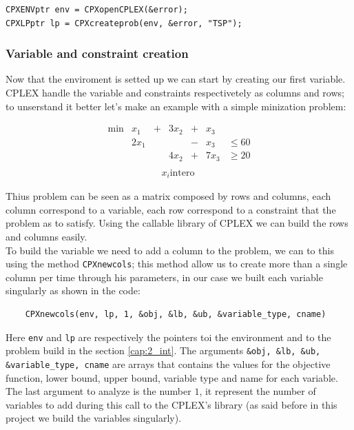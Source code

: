 \begin{lstlisting}
CPXENVptr env = CPXopenCPLEX(&error);
CPXLPptr lp = CPXcreateprob(env, &error, "TSP");
\end{lstlisting}

\subsubsection{Variable and constraint creation}
Now that the enviroment is setted up we can start by creating our first variable. CPLEX handle the variable and constraints respectivetely as columns and rows; to unserstand it better let's make an example with a simple minization problem:

\[ \begin{array}{lllllll}%
	\text{min}  &x_1 	&+ 	& 3x_2 &+ & x_3\\
	  			&  2x_1 &  	&   &- &x_3 &\le 60\\
	  			&		&	& 4x_2 & + &7x_3 &\ge 20\\
\end{array}\]%
\begin{align*}
x_i \text{intero}\
\end{align*}

Thius problem can be seen as a matrix composed by rows and columns, each column correspond to a variable, each row correspond to a constraint that the problem as to satisfy. Using the callable library of CPLEX we can build the rows and columns easily.\\
To build the variable we need to add a column to the problem, we can to this using the method \verb|CPXnewcols|; this method allow us to create more than a single column per time through his parameters, in our case we built each variable singularly as shown in the code:

\begin{lstlisting}
	CPXnewcols(env, lp, 1, &obj, &lb, &ub, &variable_type, cname)
\end{lstlisting}

Here \verb|env| and \verb|lp| are respectively the  pointers toi the environment and to the problem build in the section \ref{cap:2_int}.
The arguments \verb|&obj, &lb, &ub, &variable_type, cname| are arrays that contains the values for the objective function, lower bound, upper bound, variable type and name for each variable. The last argument to analyze is the number $1$, it represent the number of variables to add during this call to the CPLEX's library (as said before in this project we build the variables singularly).

